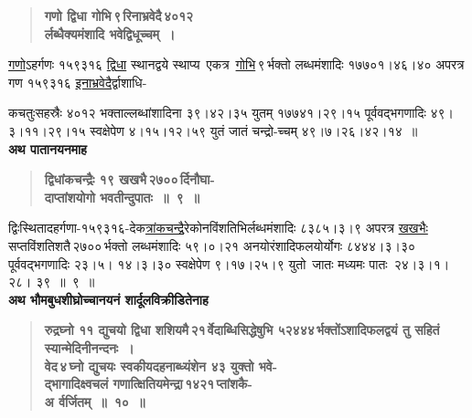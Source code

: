 \documentclass[11pt, openany]{book}
\begin{document}
 \label{1.9.1}
\begin{quote}
{\large \textbf{{\color{purple}गणो द्विधा गोभि\textendash \,९\textendash \,रिनाभ्रवेदै\textendash \,४०१२\textendash \\
र्लब्धैक्यमंशादि भवेद्विधूच्चम्~।}}}
\end{quote}

\hyperref[1.9.1]{गणो}ऽहर्गणः \;१५९३१६ \;\hyperref[1.9.1]{द्विधा} \;स्थानद्वये \;स्थाप्य \,एकत्र \,\hyperref[1.9.1]{गोभि}\textendash \,९\textendash \,र्भक्तो लब्धमंशादिः १७७०१।४६।४० अपरत्र गण १५९३१६ \hyperref[1.9.1]{इनाभ्रवेदै}र्द्वाशाधि-

\newpage

\noindent कचतुःसहस्रैः ४०१२ भक्ताल्लब्धांशादिना ३९।४२।३५ युतम् १७७४१।२९।१५ पूर्ववद्भगणादिः ४९।३।११।२९।१५ स्वक्षेपेण ४।१५।१२।५९ युतं जातं चन्द्रो-च्चम् ४९।७।२६।४२।१४~॥\\

{\small \textbf{अथ पातानयनमाह\textendash }}

 \label{1.9}
\begin{quote}
{\large \textbf{{\color{purple}द्विधांकचन्द्रैः १९ खखभै\textendash \,२७००\textendash \,र्दिनौघा-\\
दाप्तांशयोगो भवतीन्दुपातः~॥~९~॥}}}
\end{quote}

द्विःस्थितादहर्गणा-१५९३१६-देक\hyperref[1.9]{त्रांकचन्द्रै}रेकोनविंशतिभिर्लब्धमंशादिः ८३८५।३।९ \;अपरत्र \;\hyperref[1.9]{खखभैः} \;सप्तविंशतिशतै\textendash \,२७००\textendash \,र्भक्तो \;लब्धमंशादिः ५९।०।२१ अनयोरंशादिफलयोर्योगः ८४४४।३।३० पूर्ववद्भगणादिः २३।५। १४।३।३० \;स्वक्षेपेण \;९।१७।२५।९ \;युतो \,जातः \;मध्यमः \;पातः \,२४।३।१।२८। ३९~॥~९~॥\\

{\small \textbf{अथ भौमबुधशीघ्रोच्चानयनं शार्दूलविक्रीडितेनाह\textendash }}

 \label{1.10}
\begin{quote}
{\large \textbf{{\color{purple}रुद्रघ्नो ११ द्युचयो द्विधा शशियमै\textendash \,२१\textendash \,र्वेदाब्धिसिद्धेषुभि\textendash 
५२४४४\textendash \,र्भक्तोंऽशादिफलद्वयं तु सहितं स्यान्मेदिनीनन्दनः~।\\
वेद\textendash \,४\textendash \,घ्नो द्युचयः स्वकीयदहनाब्ध्यंशेन ४३ युक्तो भवे-\\
द्भागादिक्ष्वचलं गणात्क्षितियमेन्द्रा\textendash \,१४२१\textendash \,प्तांशकै-\\
{\color{white}अ} \hfill र्वर्जितम्~॥~१०~॥}}}
\end{quote}
\end{document}

